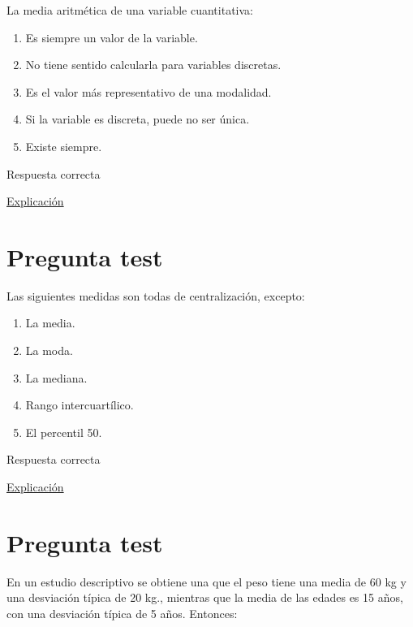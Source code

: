 \documentclass[
]{book}
\providecommand{\tightlist}{%
  \setlength{\itemsep}{0pt}\setlength{\parskip}{0pt}}
\begin{document}
La media aritmética de una variable cuantitativa:

\begin{enumerate}
\def\labelenumi{\alph{enumi})}
\tightlist
\item
  Es siempre un valor de la variable.
\item
  No tiene sentido calcularla para variables discretas.
\item
  Es el valor más representativo de una modalidad.
\item
  Si la variable es discreta, puede no ser única.
\item
  Existe siempre.
\end{enumerate}

Respuesta correcta

\href{https://1fjmanzano.github.io/bioestadistica/medidas-de-posicio\%CC\%81n-dispersio\%CC\%81n-y-forma.html\#medidas-de-posicio\%CC\%81n-centrales}{Explicación}

\hypertarget{pregunta-test-64}{%
\section{Pregunta test}\label{pregunta-test-64}}

Las siguientes medidas son todas de centralización, excepto:

\begin{enumerate}
\def\labelenumi{\alph{enumi})}
\tightlist
\item
  La media.
\item
  La moda.
\item
  La mediana.
\item
  Rango intercuartílico.
\item
  El percentil 50.
\end{enumerate}

Respuesta correcta

\href{https://1fjmanzano.github.io/bioestadistica/medidas-de-posicio\%CC\%81n-dispersio\%CC\%81n-y-forma.html\#medidas-de-posicio\%CC\%81n-centrales}{Explicación}

\hypertarget{pregunta-test-65}{%
\section{Pregunta test}\label{pregunta-test-65}}

En un estudio descriptivo se obtiene una que el peso tiene una media de 60 kg y una desviación típica de 20 kg., mientras que la media de las edades es 15 años, con una desviación típica de 5 años. Entonces:
\end{document}
